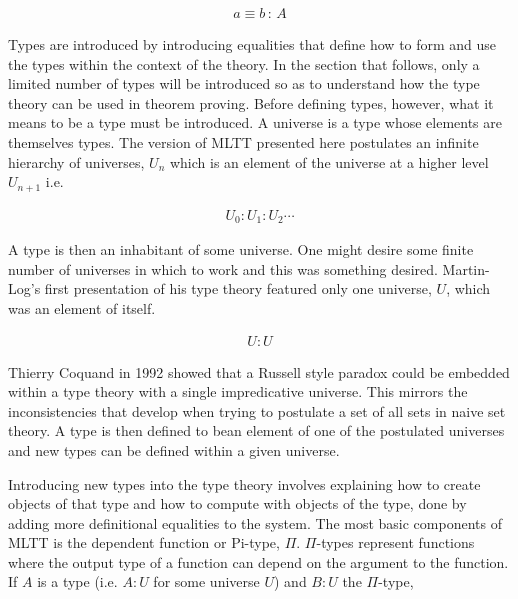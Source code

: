 \begin{align*}
    a \equiv b \, : \, A
\end{align*}

Types are introduced by introducing equalities that define how to form and use
the types within the context of the theory. In the section that follows, only a
limited number of types will be introduced so as to understand how the type
theory can be used in theorem proving. Before defining types, however, what it
means to be a type must be introduced. A universe is a type whose elements are
themselves types. The version of MLTT presented here postulates an infinite
hierarchy of universes, $U_{n}$ which is an element of the universe at a higher
level $U_{n+1}$ i.e.

\begin{align*}
    U_{0} : U_{1} : U_{2} \cdots
\end{align*}

A type is then an inhabitant of some universe. One might desire some finite
number of universes in which to work and this was something \mlt{} desired.
Martin-Log's first presentation of his type theory featured only one universe,
$U$, which was an element of itself.

\begin{align*}
    U : U
\end{align*}

Thierry Coquand in 1992 showed that a Russell style paradox could be embedded
within a type theory with a single impredicative universe. This mirrors the
inconsistencies that develop when trying to postulate a set of all sets in naive
set theory. A type is then defined to bean element of one of the postulated
universes and new types can be defined within a given universe.



Introducing new types into the type theory involves explaining how to create
objects of that type and how to compute with objects of the type, done by adding
more definitional equalities to the system.  The most basic components of MLTT
is the dependent function or Pi-type, $\Pi$. $\Pi$-types represent functions
where the output type of a function can depend on the argument to the function.
If $A$ is a type (i.e. $A : U$ for some universe $U$) and $B : U$  the
$\Pi$-type,

